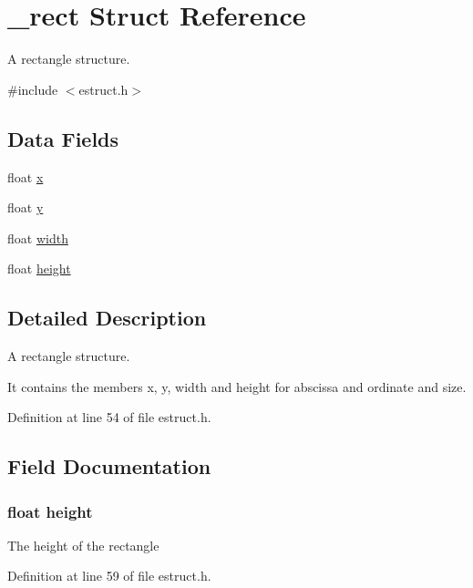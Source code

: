 \hypertarget{struct__rect}{\section{\-\_\-rect Struct Reference}
\label{struct__rect}
}


A rectangle structure.  




{\ttfamily \#include $<$estruct.\-h$>$}

\subsection*{Data Fields}
\begin{DoxyCompactItemize}
\item 
float \hyperlink{struct__rect_ad0da36b2558901e21e7a30f6c227a45e}{x}
\item 
float \hyperlink{struct__rect_aa4f0d3eebc3c443f9be81bf48561a217}{y}
\item 
float \hyperlink{struct__rect_ae426f00e82704fa09578f5446e22d915}{width}
\item 
float \hyperlink{struct__rect_a48083b65ac9a863566dc3e3fff09a5b4}{height}
\end{DoxyCompactItemize}


\subsection{Detailed Description}
A rectangle structure. 

It contains the members x, y, width and height for abscissa and ordinate and size. 

Definition at line 54 of file estruct.\-h.



\subsection{Field Documentation}
\hypertarget{struct__rect_a48083b65ac9a863566dc3e3fff09a5b4}{
\subsubsection[{height}]{\setlength{\rightskip}{0pt plus 5cm}float height}}\label{struct__rect_a48083b65ac9a863566dc3e3fff09a5b4}
The height of the rectangle 

Definition at line 59 of file estruct.\-h.

